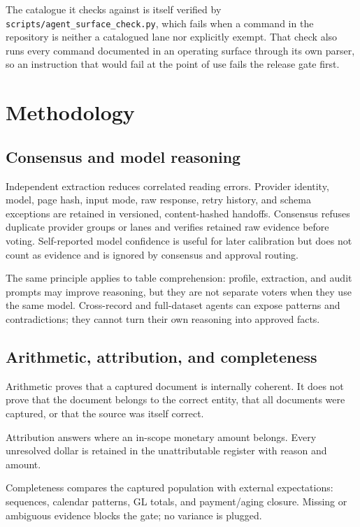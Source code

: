 \documentclass[
]{article}
\begin{document}
The catalogue it checks against is itself verified by
\texttt{scripts/\allowbreak{}agent\_\allowbreak{}surface\_\allowbreak{}check.py},
which fails when a command in the repository is neither a catalogued
lane nor explicitly exempt. That check also runs every command
documented in an operating surface through its own parser, so an
instruction that would fail at the point of use fails the release gate
first.

\section{Methodology}\label{methodology}

\subsection{Consensus and model
reasoning}\label{consensus-and-model-reasoning}

Independent extraction reduces correlated reading errors. Provider
identity, model, page hash, input mode, raw response, retry history, and
schema exceptions are retained in versioned, content-hashed handoffs.
Consensus refuses duplicate provider groups or lanes and verifies
retained raw evidence before voting. Self-reported model confidence is
useful for later calibration but does not count as evidence and is
ignored by consensus and approval routing.

The same principle applies to table comprehension: profile, extraction,
and audit prompts may improve reasoning, but they are not separate
voters when they use the same model. Cross-record and full-dataset
agents can expose patterns and contradictions; they cannot turn their
own reasoning into approved facts.

\subsection{Arithmetic, attribution, and
completeness}\label{arithmetic-attribution-and-completeness}

Arithmetic proves that a captured document is internally coherent. It
does not prove that the document belongs to the correct entity, that all
documents were captured, or that the source was itself correct.

Attribution answers where an in-scope monetary amount belongs. Every
unresolved dollar is retained in the unattributable register with reason
and amount.

Completeness compares the captured population with external
expectations: sequences, calendar patterns, GL totals, and payment/aging
closure. Missing or ambiguous evidence blocks the gate; no variance is
plugged.
\end{document}
